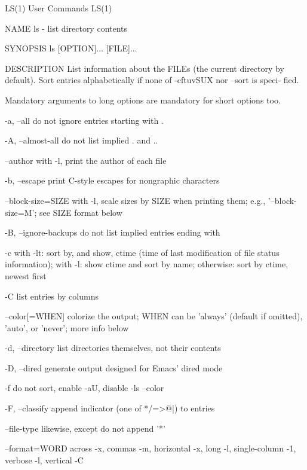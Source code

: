\documentclass{article}
\begin{document}
LS(1)                            User Commands                           LS(1)

NAME
       ls - list directory contents

SYNOPSIS
       ls [OPTION]... [FILE]...

DESCRIPTION
       List  information  about  the FILEs (the current directory by default).
       Sort entries alphabetically if none of -cftuvSUX nor --sort  is  speci‐
       fied.

       Mandatory  arguments  to  long  options are mandatory for short options
       too.

       -a, --all
              do not ignore entries starting with .

       -A, --almost-all
              do not list implied . and ..

       --author
              with -l, print the author of each file

       -b, --escape
              print C-style escapes for nongraphic characters

       --block-size=SIZE
              with  -l,  scale  sizes  by  SIZE  when  printing  them;   e.g.,
              '--block-size=M'; see SIZE format below

       -B, --ignore-backups
              do not list implied entries ending with ~

       -c     with -lt: sort by, and show, ctime (time of last modification of
              file status information); with -l: show ctime and sort by  name;
              otherwise: sort by ctime, newest first

       -C     list entries by columns

       --color[=WHEN]
              colorize  the output; WHEN can be 'always' (default if omitted),
              'auto', or 'never'; more info below

       -d, --directory
              list directories themselves, not their contents

       -D, --dired
              generate output designed for Emacs' dired mode

       -f     do not sort, enable -aU, disable -ls --color

       -F, --classify
              append indicator (one of */=>@|) to entries

       --file-type
              likewise, except do not append '*'

       --format=WORD
              across -x, commas -m, horizontal -x, long -l, single-column  -1,
              verbose -l, vertical -C
\end{document}
